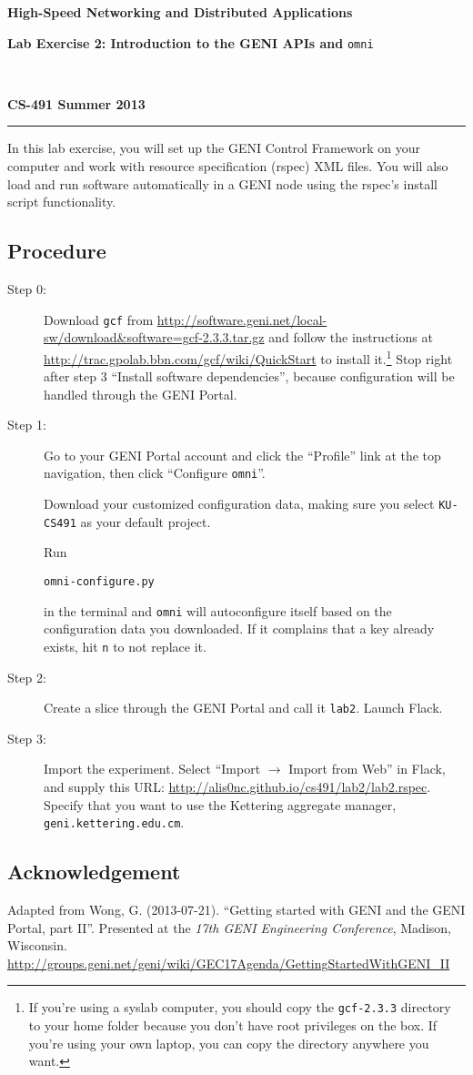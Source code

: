 \documentclass[12pt,letterpaper]{article}
\makeatletter
\newcommand*{\textoverline}[1]{$\overline{\hbox{#1}}\m@th$}
\newcommand*{\fitb}[2]
{\raisebox{-1.3ex}{\textoverline{{\makebox[#1]{{\rule{0pt}{5pt}\tiny #2}}}}}}
\makeatother
\begin{document}
\raggedright
\centerline{\textbf{High-Speed Networking and Distributed Applications}}
\centerline{\textbf{Lab Exercise 2: Introduction to the GENI APIs and} \texttt{omni}}
~\\
\centerline{\textbf{CS-491 \hfill Summer 2013}}
\noindent\rule{\textwidth}{1pt}

\bigskip
In this lab exercise, you will set up the GENI Control Framework on your 
computer and work with resource specification (rspec) XML files. You will also 
load and run software automatically in a GENI node using the rspec's install 
script functionality.


\subsection*{Procedure}

\begin{description}

\item[Step 0:]
Download \texttt{gcf} from  
\url{http://software.geni.net/local-sw/download&software=gcf-2.3.3.tar.gz} 
and follow the instructions at 
\url{http://trac.gpolab.bbn.com/gcf/wiki/QuickStart} to install it.\footnote
    {If you're using a syslab computer, you should copy the 
    \texttt{gcf-2.3.3} directory to your home folder because you don't have 
    root privileges on the box. If you're using your own laptop, you can copy 
    the directory anywhere you want.}
Stop right after step 3 ``Install software dependencies'', because 
configuration will be handled through the GENI Portal.

\item[Step 1:]
Go to your GENI Portal account and click the ``Profile'' link at the top 
navigation, then click ``Configure \texttt{omni}''. 

Download your customized configuration data, making sure you select 
\texttt{KU-CS491} as your default project.

Run 
\begin{verbatim}
omni-configure.py
\end{verbatim}
in the terminal and \texttt{omni} will autoconfigure itself based on the 
configuration data you downloaded. If it complains that a key already exists, 
hit \texttt{n} to not replace it.

\item[Step 2:]
Create a slice through the GENI Portal and call it 
\fitb{1in}{username}\texttt{lab2}. Launch Flack.

\item[Step 3:]
Import the experiment. Select ``Import $\rightarrow$ Import from Web'' in
Flack, and supply this URL: 
\url{http://alis0nc.github.io/cs491/lab2/lab2.rspec}.
Specify that you want to use the Kettering aggregate manager, 
\texttt{geni.kettering.edu.cm}.

\end{description}

\subsection*{Acknowledgement}

Adapted from Wong, G. (2013-07-21).
``Getting started with GENI and the GENI Portal, part II''.
Presented at the \emph{17th GENI Engineering Conference}, Madison, Wisconsin.
\url{http://groups.geni.net/geni/wiki/GEC17Agenda/GettingStartedWithGENI_II}
\end{document}
